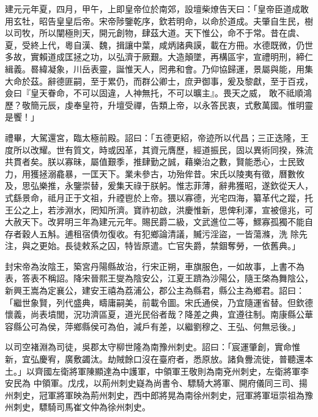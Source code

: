 
\begin{pinyinscope}

 建元元年夏，四月，甲午，上即皇帝位於南郊，設壇柴燎告天曰：「皇帝臣道成敢用玄牡，昭告皇皇后帝。宋帝陟鑒乾序，欽若明命，以命於道成。夫肇自生民，樹以司牧，所以闡極則天，開元創物，肆茲大道。天下惟公，命不于常。昔在虞、夏，受終上代，粵自漢、魏，揖讓中葉，咸炳諸典謨，載在方冊。水德既微，仍世多故，實賴道成匡拯之功，以弘濟于厥艱。大造顛墜，再構區宇，宣禮明刑，締仁緝義。晷緯凝象，川岳表靈，誕惟天人，罔弗和會。乃仰協歸運，景屬與能，用集大命於茲。辭德匪嗣，至于累仍，而群公卿士，庶尹御事，爰及黎獻，至于百戎，僉曰『皇天眷命，不可以固違，人神無托，不可以曠主』。畏天之威，
 敢不祗順鴻歷？敬簡元辰，虔奉皇符，升壇受禪，告類上帝，以永答民衷，式敷萬國。惟明靈是饗！」



 禮畢，大駕還宮，臨太極前殿。詔曰：「五德更紹，帝迹所以代昌；三正迭隆，王度所以改耀。世有質文，時或因革，其資元膺歷，經道振民，固以異術同揆，殊流共貫者矣。朕以寡昧，屬值艱季，推肆勤之誠，藉樂治之數，賢能悉心，士民致力，用獲拯溺龕暴，一匡天下。業未參古，功殆侔昔。宋氏以陵夷有徵，曆數攸及，思弘樂推，永鑒崇替，爰集天祿于朕躬。惟志菲薄，辭弗獲昭，遂欽從天人，式繇景命，祗月正于文祖，升禋鬯於上帝。猥以寡德，光宅四海，纂革代之蹤，托王公之上，若涉淵水，罔知所濟。寶祚初啟，洪慶惟新，思俾利澤，宣被億兆，可大赦天下。改昇明三年為建元元年。賜民爵二級，文武進位二等，鰥寡孤獨不能自存者穀人五斛。逋租宿債勿復收。有犯鄉論清議，贓污淫盜，一皆蕩滌，洗
 除先注，與之更始。長徒敕系之囚，特皆原遣。亡官失爵，禁錮奪勞，一依舊典。」



 封宋帝為汝陰王，築宮丹陽縣故治，行宋正朔，車旗服色，一如故事，上書不為表，答表不稱詔。降宋晉熙王燮為陰安公，江夏王躋為沙陽公，隨王棨為舞陰公，新興王嵩為定襄公，建安王禧為荔浦公，郡公主為縣君，縣公主為鄉君。詔曰：「繼世象賢，列代盛典，疇庸嗣美，前載令圖。宋氏通侯，乃宜隨運省替。但欽德懷義，尚表墳閭，況功濟區夏，道光民俗者哉？降差之典，宜遵往制。南康縣公華容縣公可為侯，萍鄉縣侯可為伯，減戶有差，以繼劉穆之、王弘、何無忌後。」



 以司空褚淵為司徒，吳郡太守柳世隆為南豫州刺史。詔曰：「宸運肇創，實命惟新，宜弘慶宥，廣敷蠲汰。劫賊餘口沒在臺府者，悉原放。諸負釁流徙，普聽還本土。」以齊國左衛將軍陳顯達為中護軍，中領軍王敬則為南兗州刺史，左衛將軍李安民為
 中領軍。戊戌，以荊州刺史嶷為尚書令、驃騎大將軍、開府儀同三司、揚州刺史，冠軍將軍映為荊州刺史，西中郎將晃為南徐州刺史，冠軍將軍垣崇祖為豫州刺史，驃騎司馬崔文仲為徐州刺史。




\end{pinyinscope}
